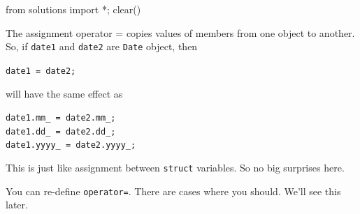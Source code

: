 \begin{python0}
from solutions import *; clear()
\end{python0}

The assignment operator = copies values of members from one object to
another. So, if \texttt{date1} and \texttt{date2} are \texttt{Date} object,
then

\texttt{date1 = date2;}

will have the same effect as
\begin{center}
\texttt{date1.mm\_ = date2.mm\_;}\\

\texttt{date1.dd\_ = date2.dd\_;}\\

\texttt{date1.yyyy\_ = date2.yyyy\_;}\\
\end{center}

This is just like assignment between \texttt{struct} variables. So no big
surprises here.

You can re-define \texttt{operator=}. There are cases where you should.
We'll see this later.


